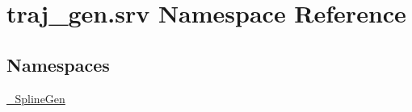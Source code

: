 \hypertarget{namespacetraj__gen_1_1srv}{}\section{traj\+\_\+gen.\+srv Namespace Reference}
\label{namespacetraj__gen_1_1srv}
\subsection*{Namespaces}
\begin{DoxyCompactItemize}
\item 
 \hyperlink{namespacetraj__gen_1_1srv_1_1___spline_gen}{\+\_\+\+Spline\+Gen}
\end{DoxyCompactItemize}
